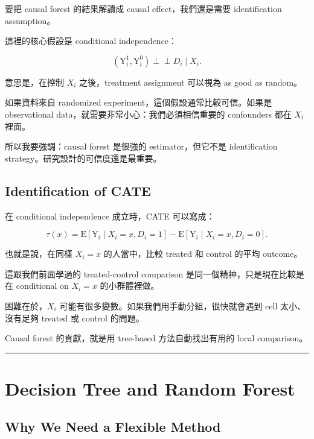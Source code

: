 \documentclass[
  chinese,
  11pt,
]{article}
\newcommand{\indep}{\perp\!\!\!\perp}
\begin{document}
要把 causal forest 的結果解讀成 causal effect，我們還是需要
identification assumption。

這裡的核心假設是 conditional independence：

\[
\left(\mathrm{Y}^{1}_{i},\mathrm{Y}^{0}_{i}\right)
\indep D_i \mid X_i.
\]

意思是，在控制 \(X_i\) 之後，treatment assignment 可以視為 as good as
random。

如果資料來自 randomized experiment，這個假設通常比較可信。如果是
observational data，就需要非常小心：我們必須相信重要的 confounders 都在
\(X_i\) 裡面。

所以我要強調：causal forest 是很強的 estimator，但它不是 identification
strategy。研究設計的可信度還是最重要。

\subsection{Identification of CATE}\label{identification-of-cate}

在 conditional independence 成立時，CATE 可以寫成：

\[
\tau(x)
=
\mathrm{E}\left[\mathrm{Y}_i\mid X_i=x,D_i=1\right]
-
\mathrm{E}\left[\mathrm{Y}_i\mid X_i=x,D_i=0\right].
\]

也就是說，在同樣 \(X_i=x\) 的人當中，比較 treated 和 control 的平均
outcome。

這跟我們前面學過的 treated-control comparison
是同一個精神，只是現在比較是在 conditional on \(X_i=x\) 的小群體裡做。

困難在於，\(X_i\) 可能有很多變數。如果我們用手動分組，很快就會遇到 cell
太小、沒有足夠 treated 或 control 的問題。

Causal forest 的貢獻，就是用 tree-based 方法自動找出有用的 local
comparison。

\begin{center}\rule{0.5\linewidth}{0.5pt}\end{center}

\section{Decision Tree and Random
Forest}\label{decision-tree-and-random-forest}

\subsection{Why We Need a Flexible
Method}\label{why-we-need-a-flexible-method}
\end{document}
